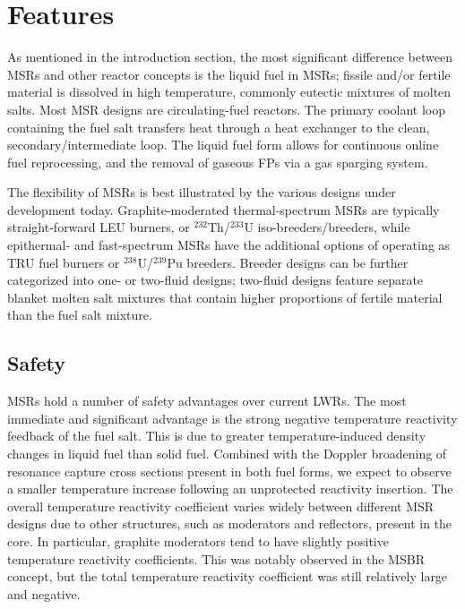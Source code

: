 \section{Features}

As mentioned in the introduction section, the most significant difference
between \glspl{MSR} and other reactor concepts is the liquid fuel in
\glspl{MSR}; fissile and/or fertile material is dissolved in high temperature,
commonly eutectic mixtures of molten salts. Most \gls{MSR} designs are
circulating-fuel reactors. The primary coolant loop containing the fuel salt
transfers heat through a heat exchanger to the clean, secondary/intermediate
loop. The liquid fuel form allows for continuous online fuel reprocessing,
and the removal of gaseous \glspl{FP} via a gas sparging system.

The flexibility of \glspl{MSR} is best illustrated by the various designs
under development today. Graphite-moderated thermal-spectrum \glspl{MSR} are
typically straight-forward \gls{LEU} burners, or $^{232}$Th/$^{233}$U
iso-breeders/breeders, while epithermal- and fast-spectrum \glspl{MSR} have
the additional options of operating as \gls{TRU} fuel burners or
$^{238}$U/$^{239}$Pu breeders. Breeder designs can be further categorized into
one- or two-fluid designs; two-fluid designs feature separate blanket molten
salt mixtures that contain higher proportions of fertile material than the
fuel salt mixture.

\subsection{Safety}

\glspl{MSR} hold a number of safety advantages over current \glspl{LWR}. The
most immediate and significant advantage is the strong negative temperature
reactivity feedback of the fuel salt. This is due to greater
temperature-induced density changes in liquid fuel than solid fuel. Combined
with the Doppler broadening of resonance capture cross sections present in
both fuel forms, we expect to observe a smaller temperature increase following
an unprotected reactivity insertion. The overall temperature reactivity
coefficient varies widely between different \gls{MSR} designs due to other
structures, such as moderators and reflectors, present in the core. In
particular, graphite moderators tend to have slightly positive temperature
reactivity coefficients. This was notably observed in the \gls{MSBR} concept,
but the total temperature reactivity coefficient was still relatively large
and negative.

